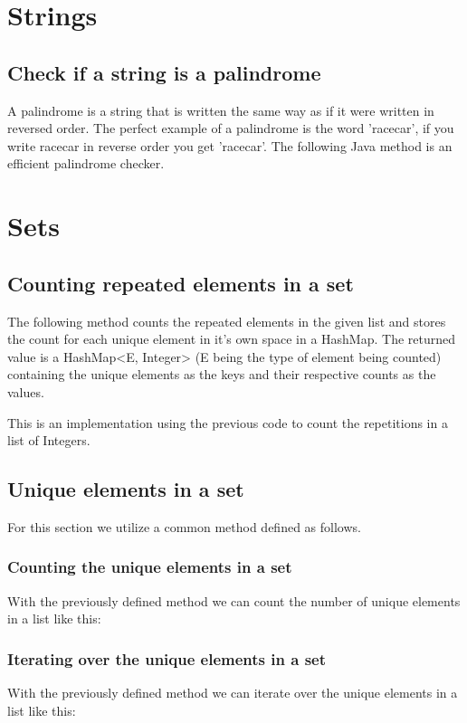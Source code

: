 \documentclass[letterpaper]{article}
\begin{document}
  \section{Strings}

    \subsection{Check if a string is a palindrome}
      A palindrome is a string that is written the same way as if it were written in reversed order. The perfect example of a palindrome is the word 'racecar', if you write racecar in reverse order you get 'racecar'. The following Java method is an efficient palindrome checker.
      

  \section{Sets}

    \subsection{Counting repeated elements in a set}
    The following method counts the repeated elements in the given list and stores the count for each unique element in it's own space in a HashMap. The returned value is a HashMap<E, Integer> (E being the type of element being counted) containing the unique elements as the keys and their respective counts as the values.
    
    This is an implementation using the previous code to count the repetitions in a list of Integers.
    

    \subsection{Unique elements in a set}
      For this section we utilize a common method defined as follows.
      

      \subsubsection{Counting the unique elements in a set}
      With the previously defined method we can count the number of unique elements in a list like this:
      

      \subsubsection{Iterating over the unique elements in a set}
      With the previously defined method we can iterate over the unique elements in a list like this:
      
\end{document}
